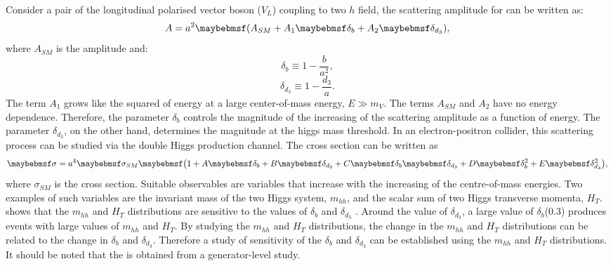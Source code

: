 Consider a pair of the longitudinal polarised  vector boson (${V}_L$) coupling to two $h$ field, the scattering amplitude for  can be written as:
\begin{equation}
A = a^2\parenths{A_{SM} + A_1\delta_b + A_2\delta_{d_3}},
\end{equation}
where $A_{SM}$ is the \SM amplitude and:
\begin{equation}
\delta_b \equiv 1 - \frac{b}{a^2},
\end{equation}
\begin{equation}
\delta_{d_3} \equiv 1 - \frac{d_3}{a}.
\end{equation}
The term $A_1$ grows like the squared of energy at a large center-of-mass energy, $E\gg{m_V}$. The terms $A_{SM}$ and $A_2$ have no energy dependence. Therefore, the parameter $\delta_b$ controls the magnitude of the increasing of the scattering amplitude as a function of energy. The parameter $\delta_{d_3}$, on the other hand, determines the magnitude at the higgs mass threshold. In an electron-positron collider, this scattering process can be studied via the double Higgs production  channel. The cross section can be written as
\begin{equation}
\label{eq:theoryGeneralHiggsCrossSection}
\sigma = a^4\sigma_{SM}\parenths{1 + A\delta_b + B\delta_{d_3} + C\delta_b\delta_{d_3} + D\delta_b^2 + E\delta_{d_3}^2},
\end{equation}
where $\sigma_{SM}$ is the \SM cross section. Suitable observables are variables that increase with the increasing of the centre-of-mass energies. Two examples of such variables are the invariant mass of the two Higgs system, $m_{hh}$, and the scalar sum of two Higgs transverse momenta, $H_T$.  shows that the $m_{hh}$ and $H_T$ distributions are sensitive to the values of $\delta_{b}$ and $\delta_{d_3}$  \cite{Contino:2013gna}. Around the \SM value of $\delta_{d_3}$, a large value of $\delta_{b} $(0.3) produces events with large values of $m_{hh}$ and $H_T$. By studying the  $m_{hh}$ and $H_T$ distributions, the change in the  $m_{hh}$ and $H_T$ distributions can be related to the  change in $\delta_{b}$ and $\delta_{d_3}$. Therefore a study of sensitivity of the $\delta_{b}$ and $\delta_{d_3}$ can be established using the $m_{hh}$ and $H_T$ distributions. It should be noted that the  is obtained from a generator-level study.

